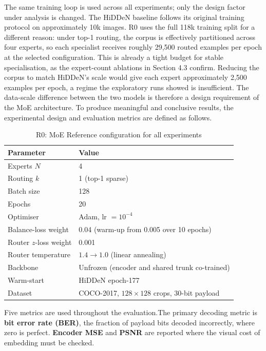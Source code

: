 ﻿\documentclass[12pt, a4paper, twoside]{report}
\numberwithin{equation}{chapter}
\begin{document}
The same training loop is used across all experiments; only the design factor under analysis is changed.
The HiDDeN baseline follows its original training protocol on approximately 10k images. R0 uses the full 118k training split for a different reason: under top-1 routing, the corpus is effectively partitioned across four experts, so each specialist receives roughly 29,500 routed examples per epoch at the selected configuration. This is already a tight budget for stable specialisation, as the expert-count ablations in Section 4.3 confirm. Reducing the corpus to match HiDDeN's scale would give each expert approximately 2,500 examples per epoch, a regime the exploratory runs showed is insufficient. The data-scale difference between the two models is therefore a design requirement of the MoE architecture. To produce meaningful and conclusive results, the experimental design and evaluation metrics are defined as follows.
\begin{table}[H]
\centering
\begin{tabular}{ll}
\toprule
\textbf{Parameter} & \textbf{Value} \\
\midrule
Experts $N$ & 4 \\
Routing $k$ & 1 (top-1 sparse) \\
Batch size & 128 \\
Epochs & 20 \\
Optimiser & Adam, lr $= 10^{-4}$ \\
Balance-loss weight & 0.04 (warm-up from 0.005 over 10 epochs) \\
Router $z$-loss weight & 0.001 \\
Router temperature & $1.4 \to 1.0$ (linear annealing) \\
Backbone & Unfrozen (encoder and shared trunk co-trained) \\
Warm-start & HiDDeN epoch-177 \\
Dataset & COCO-2017, $128\times128$ crops, 30-bit payload \\
\bottomrule
\end{tabular}
\caption{R0:  MoE Reference configuration for all experiments}
\label{tab:moe-config}
\end{table}
Five metrics are used throughout the evaluation.The primary decoding metric is \textbf{bit error rate (BER)}, the fraction of payload bits decoded incorrectly, where zero is perfect. \textbf{Encoder MSE} and \textbf{PSNR} are reported where the visual cost of embedding must be checked.
\end{document}
